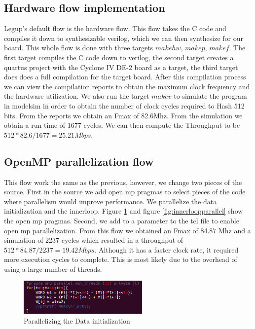 \documentclass[conference]{IEEEtran}
\begin{document}
\subsection{Hardware flow implementation}
Legup's default flow is the hardware flow. This flow takes the C code and compiles it down to synthesizable verilog, which we can then synthesize for our board. This whole flow is done with three targets $make hw$, $make p$, $make f$. The first target compiles the C code down to verilog, the second target creates a quartus project with the Cyclone IV DE-2 board as a target, the third target does does a full compilation for the target board. After this compilation process we can view the compilation reports to obtain the maximum clock frequency and the hardware utilization. We also run the target $make v$ to simulate the program in modelsim in order to obtain the number of clock cycles required to Hash 512 bits. From the reports  we obtain an Fmax of 82.6Mhz. From the simulation we obtain a run time of 1677 cycles. We can then compute the  Throughput to be $512*82.6/1677= 25.21Mbps$. 

\subsection{OpenMP parallelization flow}
This flow work the same as the previous, however, we change two pieces of the source. First in the source we add open mp pragmas to select pieces of the code where parallelism would improve performance. We parallelize the data initialization and the innerloop. Figure \ref{fig:datainitparallel} and figure \ref{fig:innerloopparallel} show the open mp pragmas. Second, we add to a parameter to the tcl file to enable open mp parallelization. From this flow we obtained an Fmax of 84.87 Mhz and a simulation of 2237 cycles which resulted in a throughput of $512*84.87/2237=19.42Mbps$. Although it has a faster clock rate, it required more execution cycles to complete. This is most likely due to the overhead of using a large number of threads.


\begin{figure}[!t]
\centering
\includegraphics[width=2.5in]{datainitparallel}
\caption{Parallelizing the Data initialization}
\label{fig:datainitparallel}
\end{figure}
\end{document}

